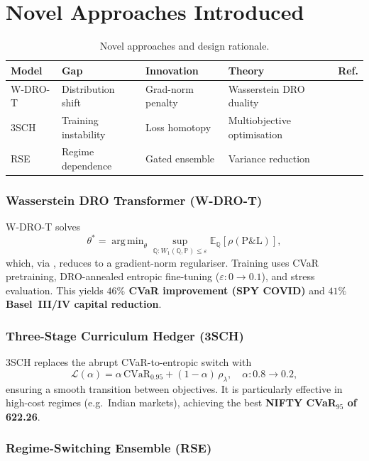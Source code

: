\documentclass[11pt,oneside]{report}
\newcommand{\cvar}{\mathrm{CVaR}}
\newcommand{\PP}{\mathbb{P}}
\newcommand{\QQ}{\mathbb{Q}}
\newcommand{\E}{\mathbb{E}}
\newcommand{\argmin}{\mathop{\mathrm{arg\,min}}}
\begin{document}
\section{Novel Approaches Introduced}

\begin{table}[  ]
\centering\small
\caption{Novel approaches and design rationale.}
\begin{tabular}{@{}lllll@{}}
\toprule
\textbf{Model} & \textbf{Gap} & \textbf{Innovation} & \textbf{Theory} & \textbf{Ref.} \\\midrule
W-DRO-T & Distribution shift & Grad-norm penalty & Wasserstein DRO duality & \citep{blanchet2019quantifying} \\
3SCH & Training instability & Loss homotopy & Multiobjective optimisation & \citep{kozyra2019deep} \\
RSE & Regime dependence & Gated ensemble & Variance reduction & \citep{dietterich2000ensemble} \\
\bottomrule
\end{tabular}
\end{table}

\subsubsection{Wasserstein DRO Transformer (W-DRO-T)}

W-DRO-T solves
\[
\theta^* = \argmin_\theta \sup_{\QQ: W_1(\QQ,\PP) \leq \varepsilon} \E_\QQ[\rho(\mathrm{P\&L})],
\]
which, via \citet{blanchet2019quantifying}, reduces to a gradient-norm regulariser. Training uses CVaR pretraining, DRO-annealed entropic fine-tuning ($\varepsilon: 0 \to 0.1$), and stress evaluation. This yields \textbf{$46\%$ CVaR improvement (SPY COVID)} and \textbf{$41\%$ Basel~III/IV capital reduction}.

\subsubsection{Three-Stage Curriculum Hedger (3SCH)}

3SCH replaces the abrupt CVaR-to-entropic switch with
\[
\mathcal{L}(\alpha) = \alpha\, \cvar_{0.95} + (1-\alpha)\, \rho_\lambda,
\quad \alpha: 0.8 \to 0.2,
\]
ensuring a smooth transition between objectives. It is particularly effective in high-cost regimes (e.g.\ Indian markets), achieving the best \textbf{NIFTY CVaR$_{95}$ of 622.26}.

\subsubsection{Regime-Switching Ensemble (RSE)}
\end{document}
